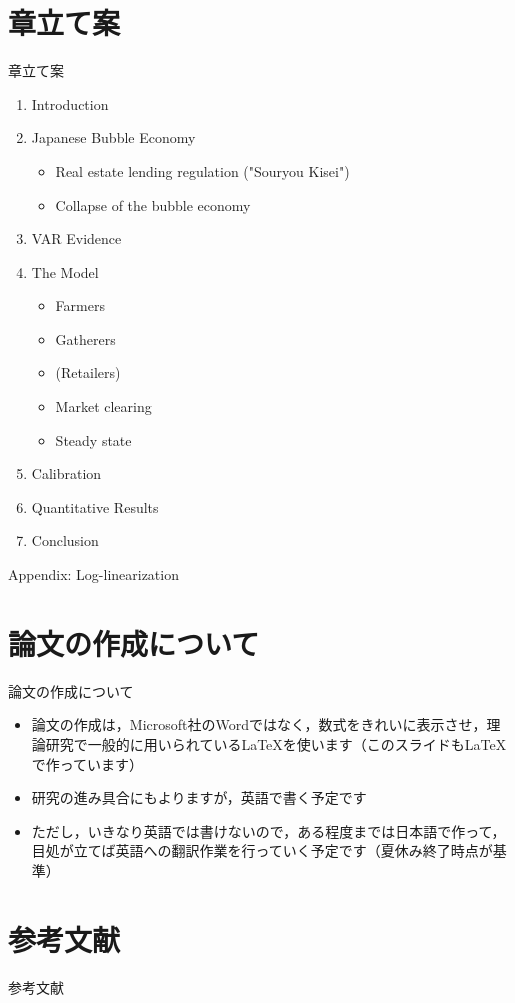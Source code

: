 \documentclass[aspectratio=169, dvipdfmx, 11pt, uplatex]{beamer}
\begin{document}
\section{章立て案}
\begin{frame}{章立て案}
\footnotesize
\begin{enumerate}
  \item Introduction
  \item Japanese Bubble Economy
    \begin{itemize}
      \item Real estate lending regulation ("Souryou Kisei")
      \item Collapse of the bubble economy
    \end{itemize}
  \item VAR Evidence
  \item The Model
    \begin{itemize}
      \item Farmers
      \item Gatherers
      \item (Retailers)
      \item Market clearing
      \item Steady state
    \end{itemize}
  \item Calibration
  \item Quantitative Results
  \item Conclusion
\end{enumerate}
  Appendix: Log-linearization
\end{frame}

\section{論文の作成について}
\begin{frame}{論文の作成について}
  \begin{itemize}
    \item 論文の作成は，Microsoft社のWordではなく，数式をきれいに表示させ，理論研究で一般的に用いられている\LaTeX を使います（このスライドも\LaTeX で作っています）
    \item 研究の進み具合にもよりますが，英語で書く予定です
    \item ただし，いきなり英語では書けないので，ある程度までは日本語で作って，目処が立てば英語への翻訳作業を行っていく予定です（夏休み終了時点が基準）
  \end{itemize}
\end{frame}

\section{参考文献}
\begin{frame}[allowframebreaks]{参考文献}
  \printbibliography
  \nocite{*}
\end{frame}
\end{document}
